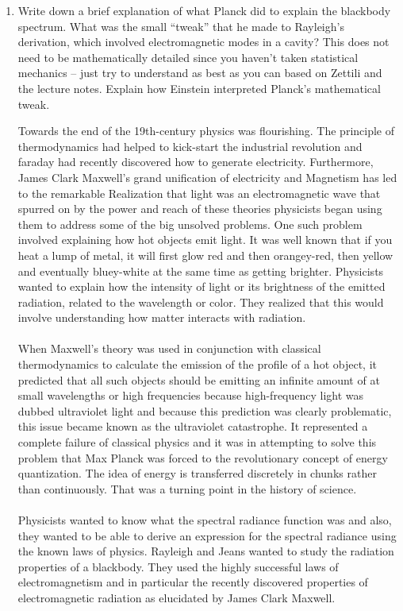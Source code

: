 \documentclass[fleqn]{article}
\begin{document}
  \begin{enumerate}
    \item Write down a brief explanation of what Planck did to explain the blackbody spectrum.  What was the small “tweak” that he made to Rayleigh’s derivation, which involved electromagnetic modes in a cavity? This does not need to be mathematically detailed since you haven’t taken statistical mechanics – just try to understand as best as you can based on Zettili and the lecture notes.  Explain how Einstein interpreted Planck's mathematical tweak.
    
      \textcolor{hwColor}{
        Towards the end of the 19th-century physics was flourishing. The principle of thermodynamics had helped to kick-start the industrial revolution and faraday had recently discovered how to generate electricity. Furthermore, James Clark Maxwell's grand unification of electricity and Magnetism has led to the remarkable Realization that light was an electromagnetic wave that spurred on by the power and reach of these theories physicists began using them to address some of the big unsolved problems. One such problem involved explaining how hot objects emit light. It was well known that if you heat a lump of metal, it will first glow red and then orangey-red, then yellow and eventually bluey-white at the same time as getting brighter. Physicists wanted to explain how the intensity of light or its brightness of the emitted radiation, related to the wavelength or color. They realized that this would involve understanding how matter interacts with radiation. \\ \\
        When Maxwell’s theory was used in conjunction with classical thermodynamics to calculate the emission of the profile of a hot object, it predicted that all such objects should be emitting an infinite amount of at small wavelengths or high frequencies because high-frequency light was dubbed ultraviolet light and because this prediction was clearly problematic, this issue became known as the ultraviolet catastrophe. It represented a complete failure of classical physics and it was in attempting to solve this problem that Max Planck was forced to the revolutionary concept of energy quantization. The idea of energy is transferred discretely in chunks rather than continuously. That was a turning point in the history of science.\\ \\
        Physicists wanted to know what the spectral radiance function was and also, they wanted to be able to derive an expression for the spectral radiance using the known laws of physics. Rayleigh and Jeans wanted to study the radiation properties of a blackbody.  They used the highly successful laws of electromagnetism and in particular the recently discovered properties of electromagnetic radiation as elucidated by James Clark Maxwell.  
}
\end{enumerate}
\end{document}

